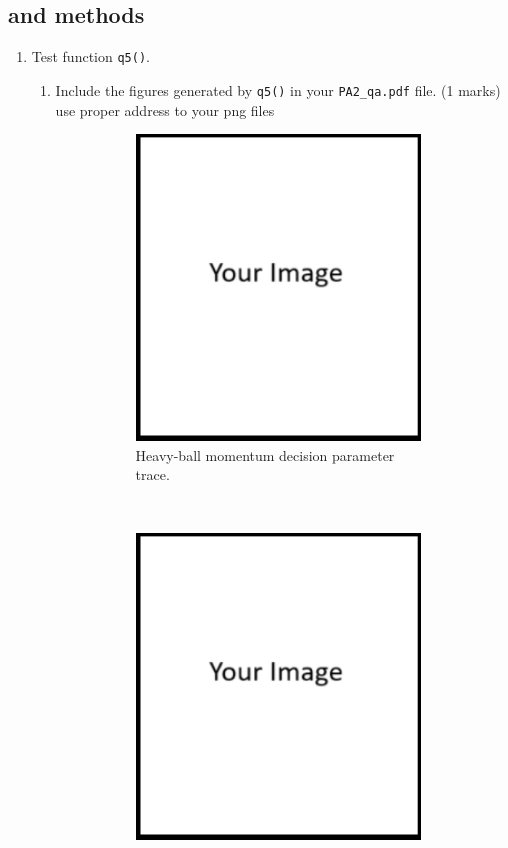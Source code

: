 \documentclass{article}
\theoremstyle{definition}
\begin{document}
\subsection{ and  methods}\label{mom}
\begin{enumerate}[label=\ref{mom}.\alph*]
	\item Test function \verb|q5()|.
	\begin{enumerate}[label=1.2.a.\roman*]
		\item Include the figures generated by \verb|q5()| in your \verb|PA2_qa.pdf| file. (1 marks)
		 use proper address to your png files
			\begin{figure}[h]
				\centering
				\begin{subfigure}[t]{0.5\textwidth}
					\centering
					\includegraphics[height=3.2in]{image.png}
					\caption{Heavy-ball momentum decision parameter trace.}
				\end{subfigure}%
				~ 
				\begin{subfigure}[t]{0.5\textwidth}
					\centering
					\includegraphics[height=3.2in]{image.png}

\end{subfigure}
\end{figure}
\end{enumerate}
\end{enumerate}
\end{document}
